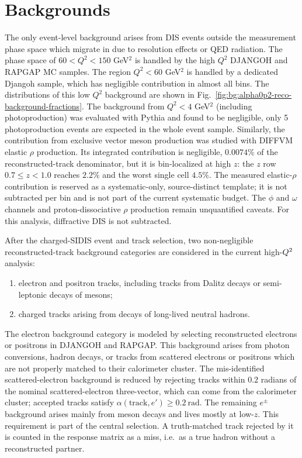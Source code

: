 \section{Backgrounds}
\label{sec:backgrounds}

The only event-level background arises from DIS events outside the measurement phase space which migrate in due to resolution effects or QED radiation. The phase space of $60 < Q^2< 150$ GeV$^2$ is handled by the high $Q^2$ DJANGOH and RAPGAP MC samples. The region $Q^2 < 60$ GeV$^2$ is handled by a dedicated Djangoh sample, which has negligible contribution in almost all bins. The distributions of this low $Q^2$ background are shown in Fig.~\ref{fig:bg:alpha0p2-reco-background-fractions}. The background from $Q^2 < 4$ GeV$^2$ (including photoproduction) was evaluated with Pythia and found to be negligible, only 5 photoproduction events are expected in the whole event sample. Similarly, the contribution from exclusive vector meson production was studied with DIFFVM elastic $\rho$ production.  Its integrated contribution is negligible, $0.0074\%$ of the reconstructed-track denominator, but it is bin-localized at high $z$: the $z$ row $0.7\le z<1.0$ reaches $2.2\%$ and the worst single cell $4.5\%$.  The measured elastic-$\rho$ contribution is reserved as a systematic-only, source-distinct template; it is not subtracted per bin and is not part of the current systematic budget.  The $\phi$ and $\omega$ channels and proton-dissociative $\rho$ production remain unquantified caveats.  For this analysis, diffractive DIS is not subtracted.

After the charged-SIDIS event and track
selection, two non-negligible reconstructed-track background categories are
considered in the current high-$Q^{2}$ analysis:
\begin{enumerate}
  \item electron and positron tracks, including tracks from Dalitz decays or
        semi-leptonic decays of mesons;
  \item charged tracks arising from decays of long-lived neutral hadrons.
\end{enumerate}


The electron background category is modeled by selecting reconstructed electrons or positrons in DJANGOH and RAPGAP. This background arises from photon conversions, hadron decays, or tracks from scattered electrons or positrons which are not properly matched to their calorimeter cluster. The mis-identified scattered-electron background is reduced by rejecting tracks within $0.2$ radians of the nominal scattered-electron three-vector, which can come from the calorimeter cluster; accepted tracks satisfy
$\alpha(\mathrm{track},e')\ge0.2~\mathrm{rad}$. The remaining $e^\pm$ background arises mainly from meson decays and lives mostly at low-$z$.
This requirement is part of the central selection.  A truth-matched track
rejected by it is counted in the response matrix as a miss, i.e.\ as a true
hadron without a reconstructed partner.

